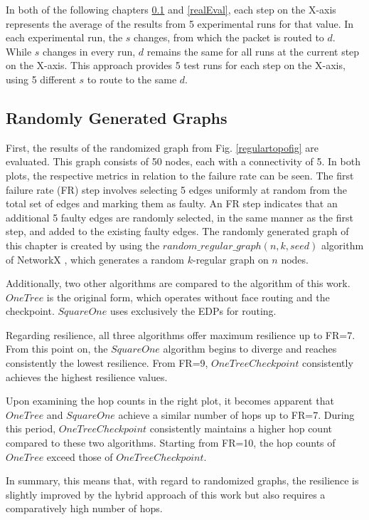 \documentclass[a4paper,UKenglish,cleveref, autoref, thm-restate,dvipsnames]{lipics-v2021}
\begin{document}
In both of the following chapters \ref{randomEval} and \ref{realEval}, each step on the X-axis represents the average of the results from 5 experimental runs for that value. In each experimental run, the $s$ changes, from which the packet is routed to $d$. While $s$ changes in every run, $d$ remains the same for all runs at the current step on the X-axis. This approach provides 5 test runs for each step on the X-axis, using 5 different $s$ to route to the same $d$.

\subsection{Randomly Generated Graphs}
\label{randomEval}
First, the results of the randomized graph from Fig. \ref{regulartopofig} are evaluated. This graph consists of 50 nodes, each with a connectivity of 5. In both plots, the respective metrics in relation to the failure rate can be seen. 
The first failure rate (FR) step involves selecting 5 edges uniformly at random from the total set of edges and marking them as faulty.
An FR step indicates that an additional 5 faulty edges are randomly selected, in the same manner as the first step, and added to the existing faulty edges.
The randomly generated graph of this chapter is created by using the $random\_regular\_graph(n, k, seed)$ algorithm of NetworkX \cite{networkx}, which generates a random
$k$-regular graph on $n$ nodes.

Additionally, two other algorithms are compared to the algorithm of this work. $OneTree$ is the original form, which operates without face routing and the checkpoint. $SquareOne$ uses exclusively the EDPs for routing.

Regarding resilience, all three algorithms offer maximum resilience up to FR=7. From this point on, the $Square One$ algorithm begins to diverge and reaches consistently the lowest resilience. 
From FR=9, $One Tree Checkpoint$ consistently achieves the highest resilience values.

Upon examining the hop counts in the right plot, it becomes apparent that $OneTree$ and $Square One$ achieve a similar number of hops up to FR=7. During this period, $OneTreeCheckpoint$ consistently maintains a higher hop count compared to these two algorithms. Starting from FR=10, the hop counts of $OneTree$ exceed those of $OneTreeCheckpoint$.

In summary, this means that, with regard to randomized graphs, the resilience is slightly improved by the hybrid approach of this work but also requires a comparatively high number of hops.
\end{document}
